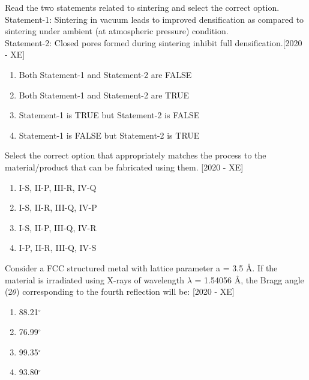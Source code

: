 \iffalse
\title{}
\author{EE24BTECH11053 - S A Aravind Eswar
}
\chapter{2020}
\section{xe}
\fi
    \item Read the two statements related to sintering and select the correct option.\\

    Statement-1: Sintering in vacuum leads to improved densification as compared to sintering under ambient (at atmospheric pressure) condition.\\

    Statement-2: Closed pores formed during sintering inhibit full densification.\hfill{[2020 - XE]}
    \begin{enumerate}
        \item Both Statement-1 and Statement-2 are FALSE
        \item Both Statement-1 and Statement-2 are TRUE
        \item Statement-1 is TRUE but Statement-2 is FALSE
        \item Statement-1 is FALSE but Statement-2 is TRUE
    \end{enumerate}

    \item Select the correct option that appropriately matches the process to the material/product that can be fabricated using them. \hfill{[2020 - XE]}
    \begin{table}[h]
        \centering
        
    \end{table}
    \begin{enumerate}
        \item I-S, II-P, III-R, IV-Q
        \item I-S, II-R, III-Q, IV-P
        \item I-S, II-P, III-Q, IV-R
        \item I-P, II-R, III-Q, IV-S
    \end{enumerate}
    \item Consider a FCC structured metal with lattice parameter a = 3.5 \r{A}. If the material is irradiated using X-rays of wavelength $\lambda$ = 1.54056 \r{A}, the Bragg angle (2$\theta$) corresponding to the fourth reflection will be: \hfill{[2020 - XE]}
    \begin{enumerate}
        \item 88.21$^\circ$
        \item 76.99$^\circ$
        \item 99.35$^\circ$
        \item 93.80$^\circ$
    \end{enumerate}
    
